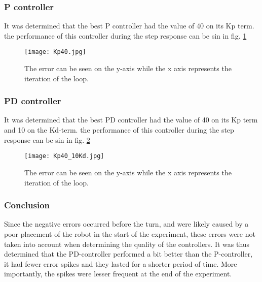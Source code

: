 \subsubsection{P controller}
It was determined that the best P controller had the value of 40 on its Kp term. the performance of this controller during the step response can be sin in fig. \ref{Kp40}

\begin{figure}[H]
    \centering
    \texttt{[image: Kp40.jpg]}
    \caption{The error can be seen on the y-axis while the x axis represents the iteration of the loop.}
    \label{Kp40}
\end{figure}

\subsubsection{PD controller}
It was determined that the best PD controller had the value of 40 on its Kp term and 10 on the Kd-term. the performance of this controller during the step response can be sin in fig. \ref{Kp40_10Kd}

\begin{figure}[H]
    \centering
    \texttt{[image: Kp40\_10Kd.jpg]}
    \caption{The error can be seen on the y-axis while the x axis represents the iteration of the loop.}
    \label{Kp40_10Kd}
\end{figure}

\subsubsection{Conclusion}
Since the negative errors occurred before the turn, and were likely caused by a poor placement of the robot in the start of the experiment, these errors were not taken into account when determining the quality of the controllers. It was thus determined that the PD-controller performed a bit better than the P-controller, it had fewer error spikes and they lasted for a shorter period of time. More importantly, the spikes were lesser frequent at the end of the experiment.
